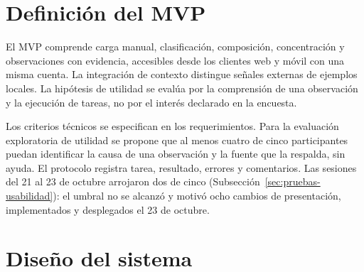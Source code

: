 \section{Definición del MVP}\label{sec:mvp}

El MVP comprende carga manual, clasificación, composición, concentración y observaciones con evidencia, accesibles desde los clientes web y móvil con una misma cuenta. La integración de contexto distingue señales externas de ejemplos locales. La hipótesis de utilidad se evalúa por la comprensión de una observación y la ejecución de tareas, no por el interés declarado en la encuesta.

Los criterios técnicos se especifican en los requerimientos. Para la evaluación exploratoria de utilidad se propone que al menos cuatro de cinco participantes puedan identificar la causa de una observación y la fuente que la respalda, sin ayuda. El protocolo registra tarea, resultado, errores y comentarios. Las sesiones del 21 al 23 de octubre arrojaron dos de cinco (Subsección~\ref{sec:pruebas-usabilidad}): el umbral no se alcanzó y motivó ocho cambios de presentación, implementados y desplegados el 23 de octubre.

\section{Diseño del sistema}\label{sec:diseno}

